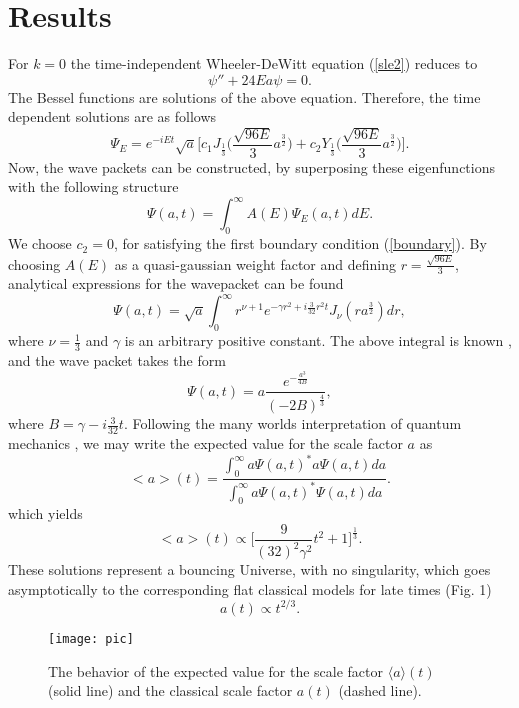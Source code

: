 \section{Results}
For $k = 0$ the time-independent  Wheeler-DeWitt equation (\ref{sle2}) reduces to
\begin{equation}
\label{eq-dust} \psi'' + 24Ea\psi = 0.
\end{equation}
The Bessel functions are solutions of the above equation. Therefore, the time dependent solutions
are as follows
\begin{equation} \label{bessel} \Psi_E =
e^{-iEt}\sqrt{a}\biggr[c_1J_{\frac{1}{3}}\biggr(\frac{\sqrt{96E}}{3}a^{\frac{3}{2}}\biggl) +
c_2Y_{\frac{1}{3}}\biggr(\frac{\sqrt{96E}}{3}a^{\frac{3}{2}}\biggl)\biggl] .
\end{equation}
Now, the wave packets can be constructed, by superposing these eigenfunctions with the following structure
\begin{equation}
\Psi(a,t) = \int_0^\infty A(E)\Psi_E(a,t)dE  .
\end{equation}
We choose $c_2 = 0$, for satisfying the first boundary condition (\ref{boundary}). By choosing
$A(E)$ as a quasi-gaussian weight factor and defining $r = \frac{\sqrt{96E}}{3}$, analytical
expressions for the wavepacket can be found
\begin{equation}
\Psi(a,t) = \sqrt{a}\int_0^\infty r^{\nu + 1}e^{-\gamma r^2 + i\frac{3}{32}r^{2}
t}J_\nu(ra^\frac{3}{2})dr,
\end{equation}
where $\nu = \frac{1}{3}$ and $\gamma$ is an arbitrary positive constant. The above integral is known \cite{gradshteyn}, and the wave packet takes
the form
\begin{equation}
\label{wp} \Psi(a,t) = a\frac{e^{-\frac{a^{3}}{4B}}}{(-2B)^{\frac{4}{3}}},
\end{equation}
where $B = \gamma - i\frac{3}{32}t$.  Following the many worlds interpretation of quantum mechanics \cite{everett}, we may write the expected value
for the scale factor $a$ as
\begin{equation}
<a>(t) = \frac{\int_0^\infty a\Psi(a,t)^*a\Psi(a,t)da} {\int_0^\infty a\Psi(a,t)^*\Psi(a,t)da} .
\end{equation}
which yields
\begin{equation} <a>(t) \propto
\biggr[\frac{9}{(32)^2\gamma^2}t^2 + 1\biggl]^\frac{1}{3} .
\end{equation}
These solutions represent a bouncing Universe, with no singularity, which goes asymptotically to
the corresponding flat classical models for late times (Fig. 1)
\begin{equation}
a(t) \propto t^{2/3}.
\end{equation}
\begin{figure}
\centering
  \texttt{[image: pic]}\\
  \caption{The behavior of the expected value
for the scale factor $\langle a\rangle(t)$ (solid line) and the
classical scale factor $a(t)$ (dashed line).}
\end{figure}

